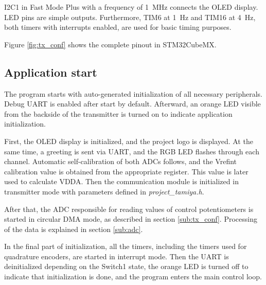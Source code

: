 I2C1 in Fast Mode Plus with a frequency of \SI{1}{\MHz} connects the OLED display. LED pins are simple outputs. Furthermore, TIM6 at \SI{1}{\Hz} and TIM16 at \SI{4}{\Hz}, both timers with interrupts enabled, are used for basic timing purposes.

Figure \ref{fig:tx_conf} shows the complete pinout in STM32CubeMX.

\subsection{Application start}
The program starts with auto-generated initialization of all necessary peripherals. Debug UART is enabled after start by default. Afterward, an orange LED visible from the backside of the transmitter is turned on to indicate application initialization.

First, the OLED display is initialized, and the project logo is displayed. At the same time, a greeting is sent via UART, and the RGB LED flashes through each channel. Automatic self-calibration of both ADCs follows, and the Vrefint calibration value is obtained from the appropriate register. This value is later used to calculate VDDA. Then the communication module is initialized in transmitter mode with parameters defined in \textit{project\_tamiya.h}.

After that, the ADC responsible for reading values of control potentiometers is started in circular DMA mode, as described in section \ref{sub:tx_conf}. Processing of the data is explained in section \ref{sub:adc}.

In the final part of initialization, all the timers, including the timers used for quadrature encoders, are started in interrupt mode. Then the UART is deinitialized depending on the Switch1 state, the orange LED is turned off to indicate that initialization is done, and the program enters the main control loop.

